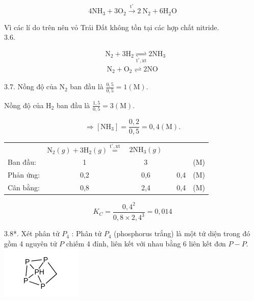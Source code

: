 \documentclass[10pt]{article}
\begin{document}
$$
4 \mathrm{NH}_{3}+3 \mathrm{O}_{2} \xrightarrow{\mathrm{t}^{\circ}} 2 \mathrm{~N}_{2}+6 \mathrm{H}_{2} \mathrm{O}
$$

Vì các lí do trên nên vỏ Trái Đất không tồn tại các hợp chất nitride.\\
3.6.

$$
\begin{aligned}
& \mathrm{N}_{2}+3 \mathrm{H}_{2} \underset{\mathrm{t}^{\circ}, \mathrm{xt}}{\rightleftharpoons} 2 \mathrm{NH}_{3} \\
& \mathrm{~N}_{2}+\mathrm{O}_{2} \rightleftharpoons 2 \mathrm{NO}
\end{aligned}
$$

3.7. Nồng độ của $\mathrm{N}_{2}$ ban đầu là $\frac{0,5}{0,5}=1(\mathrm{M})$.

Nồng độ của $\mathrm{H}_{2}$ ban đầu là $\frac{1,5}{0,5}=3(\mathrm{M})$.

$$
\Rightarrow\left[\mathrm{NH}_{3}\right]=\frac{0,2}{0,5}=0,4(\mathrm{M}) .
$$

\begin{center}
\begin{tabular}{lcclcl}
 & $\mathrm{N}_{2}(g)+3 \mathrm{H}_{2}(g) \stackrel{\mathrm{t}^{\circ}, \mathrm{xt}}{=}$ & $2 \mathrm{NH}_{3}(g)$ &  &  &  \\
Ban đầu: & 1 & 3 &  &  & (M) \\
Phản ứng: & 0,2 & 0,6 &  & 0,4 & (M) \\
Cân bằng: & 0,8 & 2,4 &  & 0,4 & (M) \\
\end{tabular}
\end{center}

$$
K_{C}=\frac{0,4^{2}}{0,8 \times 2,4^{3}}=0,014
$$

3.8*. Xét phân tử $P_{4}$ : Phân tử $P_{4}$ (phosphorus trắng) là một tứ diện trong đó gồm 4 nguyên tử $P$ chiếm 4 đỉnh, liên kết với nhau bằng 6 liên kết đơn $P-P$.\\
\includegraphics{smile-2b848151a8ab1b324877f516a051bcf80022aa9c}
\end{document}
